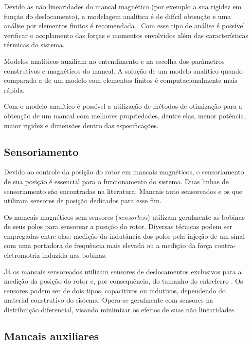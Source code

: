 Devido as não linearidades do mancal magnético (por exemplo a sua rigidez em função do deslocamento), a modelagem analítica é de difícil obtenção e uma análise por elementos finitos é recomendada \citep{pilat2007automatic}. Com esse tipo de análise é possível verificar o acoplamento das forças e momentos envolvidos além das características térmicas do sistema.

Modelos analíticos \citep{Tezuka2013, Chiba} auxiliam no entendimento e na escolha dos parâmetros construtivos e magnéticos do mancal. A solução de um modelo analítico quando comparada a de um modelo com elementos finitos é computacionalmente mais rápida.

Com o modelo analítico é possível a utilização de métodos de otimização \citep{Wu2009, Fang2014} para a obtenção de um mancal com melhores propriedades, dentre elas, menor potência, maior rigidez e dimensões dentro das especificações. 

\subsection{Sensoriamento}

Devido ao controle da posição do rotor em mancais magnéticos, o sensoriamento de sua posição é essencial para o funcionamento do sistema. Duas linhas de sensoriamento são encontradas na literatura: Mancais auto sensoreados \citep{Vischer1993} e os que utilizam sensores de posição dedicados para esse fim.

Os mancais magnéticos sem sensores (\textit{sensorless}) utilizam geralmente as bobinas de seus polos para sensorear a posição do rotor. Diversas técnicas podem ser empregadas \citep{Hofer2009a, Mukhopadhyay2005} entre elas: medição da indutância dos polos pela injeção de um sinal com uma portadora de frequência mais elevada ou a medição da força contra-eletromotriz induzida nas bobinas.
 
Já os mancais sensoreados utilizam sensores de deslocamentos exclusivos para a medição da posição do rotor e, por consequência, do tamanho do entreferro \citep{Sivadasan1996}. Os sensores podem ser de dois tipos, capacitivos ou indutivos, dependendo do material construtivo do sistema. Opera-se geralmente com sensores na distribuição diferencial, visando minimizar os efeitos de suas não linearidades.
 
\subsection{Mancais auxiliares}

